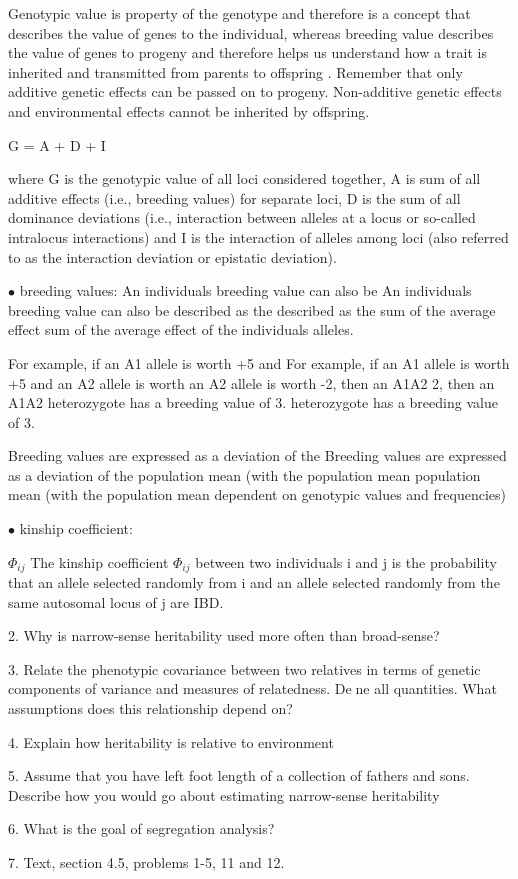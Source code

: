 \documentclass{article}
\begin{document}
Genotypic value is property of the genotype and therefore is a concept that describes the value of genes to the individual, whereas breeding value describes the value of genes to progeny and therefore helps us understand how a trait is inherited and transmitted from parents to offspring . Remember that only additive genetic effects can be passed on to progeny. Non-additive genetic effects and environmental effects cannot be inherited by offspring.

  G = A + D + I

where G is the genotypic value of all loci considered together, A is sum of all additive effects (i.e., breeding values) for separate loci, D is the sum of all dominance deviations (i.e., interaction between alleles at a locus or so-called intralocus interactions) and I is the interaction of alleles among loci (also referred to as the interaction deviation or epistatic deviation).


\vspace{1pc}
$\bullet$ breeding values:
An individuals breeding value can also be An individuals breeding value can also be
described as the described as the sum of the average effect sum of the average effect of the
individuals alleles.

For example, if an A1 allele is worth +5 and For example, if an A1 allele is worth +5 and
an A2 allele is worth an A2 allele is worth
-2, then an A1A2 2, then an A1A2
heterozygote has a breeding value of 3. heterozygote has a breeding value of 3.

Breeding values are expressed as a deviation of the Breeding values are expressed as a deviation of the
population mean (with the population mean population mean (with the population mean
dependent on genotypic values and frequencies)


\vspace{1pc}
$\bullet$ kinship coefficient:

	$\Phi_{ij} $ The kinship coefficient $\Phi_{ij} $ between two individuals i and j
	is the probability that an allele selected randomly from i and an allele selected randomly
	from the same autosomal locus of j are IBD.
	
	
\vspace{2pc}
2. Why is narrow-sense heritability used more often than broad-sense?


\vspace{2pc}
3. Relate the phenotypic covariance between two relatives in terms of genetic
components of variance and measures of relatedness. Dene all quantities.
What assumptions does this relationship depend on?


\vspace{2pc}
4. Explain how heritability is relative to environment


\vspace{2pc}
5. Assume that you have left foot length of a collection of fathers and sons.
Describe how you would go about estimating narrow-sense heritability


\vspace{2pc}
6. What is the goal of segregation analysis?


\vspace{2pc}
7. Text, section 4.5, problems 1-5, 11 and 12.
\end{document}
